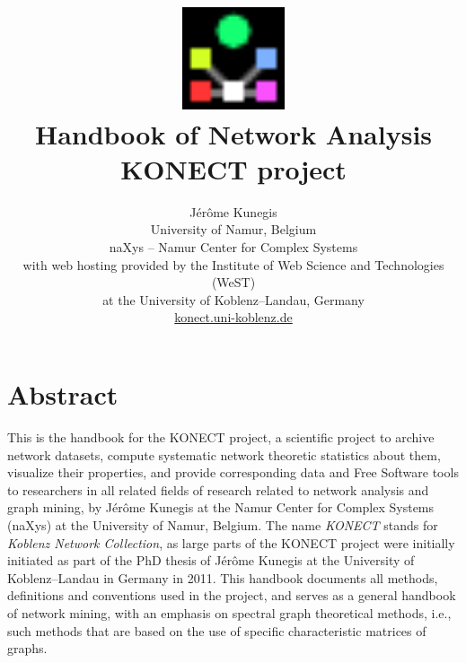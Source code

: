\documentclass{article}
\begin{document}
\title{
  \includegraphics[width=3cm]{konect-logo} \\
  \vspace{1cm}
         {\Huge Handbook of Network Analysis} \\
         KONECT project
}

\author{
  Jérôme Kunegis \\
  University of Namur, Belgium \\
  naXys -- Namur Center for Complex Systems \\
  {\small with web hosting provided by the Institute of Web Science and
    Technologies (WeST)} \\ 
  {\small at the University of Koblenz--Landau, Germany} \\
  {\small \href{http://konect.uni-koblenz.de/}{konect.uni-koblenz.de}}
}

\maketitle

\section*{Abstract}
This is the handbook for the KONECT project, a scientific project to
archive network datasets, compute systematic network theoretic
statistics about them, visualize their properties, and provide
corresponding data and Free Software tools to researchers in all related
fields of research related to network analysis and graph mining, by
Jérôme Kunegis at the Namur Center for Complex Systems (naXys) at the
University of Namur, Belgium.  The name \emph{KONECT} stands for
\emph{Koblenz Network Collection}, as large parts of the KONECT project
were initially initiated as part of the PhD thesis of Jérôme Kunegis at
the University of Koblenz--Landau in Germany in 2011.  This handbook
documents all methods, definitions and conventions used in the project,
and serves as a general handbook of network mining, with an emphasis on
spectral graph theoretical methods, i.e., such methods that are based on
the use of specific characteristic matrices of graphs. 
\end{document}
